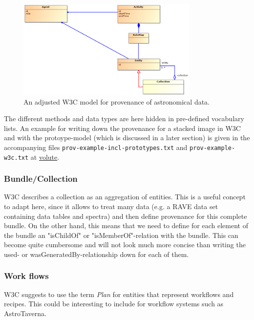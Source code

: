 \documentclass[11pt,a4paper]{ivoa}
\begin{document}
\begin{figure}
\centering
\includegraphics[width=0.8\textwidth]{ProvDM-W3C-adjusted.png}
\caption{An adjusted W3C model for provenance of astronomical data.}
\label{fig:classes-w3c-adjusted}
\end{figure}


The different methods and data types are here hidden in pre-defined vocabulary lists. 
An example for writing down the provenance for a stacked image in W3C and with the protoype-model (which is discussed in a later section) is given in the accompanying files 
\texttt{prov-example-incl-prototypes.txt} and 
\texttt{prov-example-w3c.txt} at \href{https://volute.g-vo.org/svn/trunk/projects/dm/provenance/description/}{volute}.




\subsubsection{Bundle/Collection}
W3C describes a collection as an aggregation of entities. This is a useful concept to adapt here, since it allows to treat many data (e.g. a RAVE data set containing data tables and spectra) and then define provenance for this complete bundle.
On the other hand, this means that we need to define for each element of the bundle an "isChildOf" or "isMemberOf"-relation with the bundle.
This can become quite cumbersome and will not look much more concise than writing the used- or wasGeneratedBy-relationship down for each of them.


\subsubsection{Work flows}
W3C suggests to use the term \emph{Plan} for entities that represent workflows and recipes. This could be interesting to include for workflow systems such as AstroTaverna. 
\end{document}
